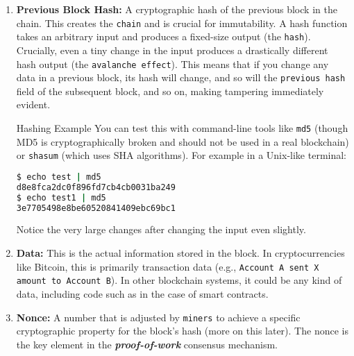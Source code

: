 \begin{enumerate}[itemsep=1pt, topsep=1pt]    
	\item \textbf{Previous Block Hash:} A cryptographic hash of the previous block in the chain.  This creates the \texttt{chain} and is crucial for immutability.  A hash function takes an arbitrary input and produces a fixed-size output (the \texttt{hash}).  Crucially, even a tiny change in the input produces a drastically different hash output (the \texttt{avalanche effect}).  This means that if you change any data in a previous block, its hash will change, and so will the \texttt{previous hash} field of the subsequent block, and so on, making tampering immediately evident.
    
\begin{example}{Hashing Example}
You can test this with command-line tools like \texttt{md5} (though MD5 is cryptographically broken and should not be used in a real blockchain) or \texttt{shasum} (which uses SHA algorithms). For example in a Unix-like terminal:
\begin{lstlisting}[language=bash, caption=Block chain hash Example]
$ echo test | md5
d8e8fca2dc0f896fd7cb4cb0031ba249
$ echo test1 | md5
3e7705498e8be60520841409ebc69bc1
\end{lstlisting}    	
Notice the very large changes after changing the input even slightly.
\end{example}

    \item \textbf{Data:} This is the actual information stored in the block. In cryptocurrencies like Bitcoin, this is primarily transaction data (e.g., \texttt{Account A sent X amount to Account B}). In other blockchain systems, it could be any kind of data, including code such as in the case of smart contracts.

    \item \textbf{Nonce:}  A number that is adjusted by \texttt{miners} to achieve a specific cryptographic property for the block's hash (more on this later).  The nonce is the key element in the \textit{\textbf{proof-of-work}} consensus mechanism.
\end{enumerate}
\vspace{1em}

